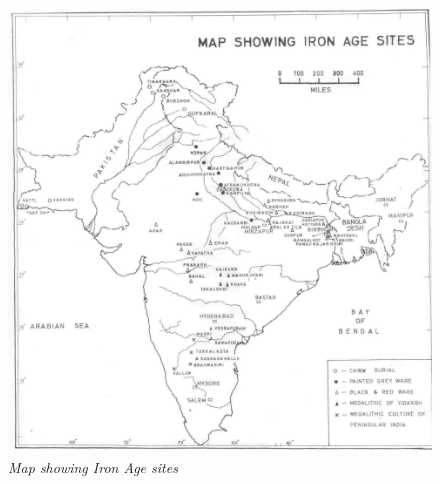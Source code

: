 \begin{figure}[H]
\includegraphics[scale=0.23]{images/chapter-1/fig004.jpg}
\caption{\textit{Map showing Iron Age sites}}\label{chapter1-fig004}
\end{figure}



